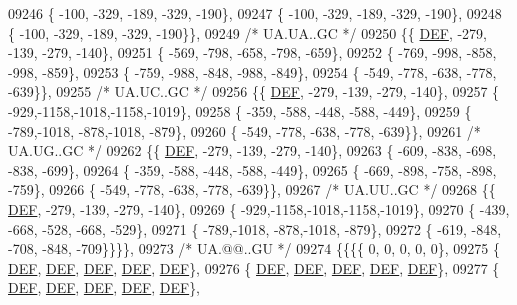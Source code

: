 \begin{DoxyCode}
09246 \{ -100, -329, -189, -329, -190\},
09247 \{ -100, -329, -189, -329, -190\},
09248 \{ -100, -329, -189, -329, -190\}\},
09249 \textcolor{comment}{/* UA.UA..GC */}
09250 \{\{  \mbox{\hyperlink{1_88_84__epars_8h_a397419fc12b37ed479c8abb9d444d843}{DEF}}, -279, -139, -279, -140\},
09251 \{ -569, -798, -658, -798, -659\},
09252 \{ -769, -998, -858, -998, -859\},
09253 \{ -759, -988, -848, -988, -849\},
09254 \{ -549, -778, -638, -778, -639\}\},
09255 \textcolor{comment}{/* UA.UC..GC */}
09256 \{\{  \mbox{\hyperlink{1_88_84__epars_8h_a397419fc12b37ed479c8abb9d444d843}{DEF}}, -279, -139, -279, -140\},
09257 \{ -929,-1158,-1018,-1158,-1019\},
09258 \{ -359, -588, -448, -588, -449\},
09259 \{ -789,-1018, -878,-1018, -879\},
09260 \{ -549, -778, -638, -778, -639\}\},
09261 \textcolor{comment}{/* UA.UG..GC */}
09262 \{\{  \mbox{\hyperlink{1_88_84__epars_8h_a397419fc12b37ed479c8abb9d444d843}{DEF}}, -279, -139, -279, -140\},
09263 \{ -609, -838, -698, -838, -699\},
09264 \{ -359, -588, -448, -588, -449\},
09265 \{ -669, -898, -758, -898, -759\},
09266 \{ -549, -778, -638, -778, -639\}\},
09267 \textcolor{comment}{/* UA.UU..GC */}
09268 \{\{  \mbox{\hyperlink{1_88_84__epars_8h_a397419fc12b37ed479c8abb9d444d843}{DEF}}, -279, -139, -279, -140\},
09269 \{ -929,-1158,-1018,-1158,-1019\},
09270 \{ -439, -668, -528, -668, -529\},
09271 \{ -789,-1018, -878,-1018, -879\},
09272 \{ -619, -848, -708, -848, -709\}\}\}\},
09273 \textcolor{comment}{/* UA.@@..GU */}
09274 \{\{\{\{    0,    0,    0,    0,    0\},
09275 \{  \mbox{\hyperlink{1_88_84__epars_8h_a397419fc12b37ed479c8abb9d444d843}{DEF}},  \mbox{\hyperlink{1_88_84__epars_8h_a397419fc12b37ed479c8abb9d444d843}{DEF}},  \mbox{\hyperlink{1_88_84__epars_8h_a397419fc12b37ed479c8abb9d444d843}{DEF}},  \mbox{\hyperlink{1_88_84__epars_8h_a397419fc12b37ed479c8abb9d444d843}{DEF}},  \mbox{\hyperlink{1_88_84__epars_8h_a397419fc12b37ed479c8abb9d444d843}{DEF}}\},
09276 \{  \mbox{\hyperlink{1_88_84__epars_8h_a397419fc12b37ed479c8abb9d444d843}{DEF}},  \mbox{\hyperlink{1_88_84__epars_8h_a397419fc12b37ed479c8abb9d444d843}{DEF}},  \mbox{\hyperlink{1_88_84__epars_8h_a397419fc12b37ed479c8abb9d444d843}{DEF}},  \mbox{\hyperlink{1_88_84__epars_8h_a397419fc12b37ed479c8abb9d444d843}{DEF}},  \mbox{\hyperlink{1_88_84__epars_8h_a397419fc12b37ed479c8abb9d444d843}{DEF}}\},
09277 \{  \mbox{\hyperlink{1_88_84__epars_8h_a397419fc12b37ed479c8abb9d444d843}{DEF}},  \mbox{\hyperlink{1_88_84__epars_8h_a397419fc12b37ed479c8abb9d444d843}{DEF}},  \mbox{\hyperlink{1_88_84__epars_8h_a397419fc12b37ed479c8abb9d444d843}{DEF}},  \mbox{\hyperlink{1_88_84__epars_8h_a397419fc12b37ed479c8abb9d444d843}{DEF}},  \mbox{\hyperlink{1_88_84__epars_8h_a397419fc12b37ed479c8abb9d444d843}{DEF}}\},

\end{DoxyCode}

